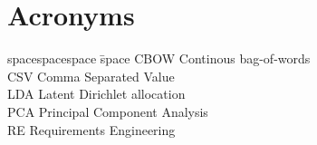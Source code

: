 \section*{Acronyms}

\begin{tabbing}
spacespacespace \= space \kill
CBOW \> Continous bag-of-words \\
CSV \> Comma Separated Value \\
LDA	\>	Latent Dirichlet allocation \\
PCA \> Principal Component Analysis\\
RE	\>	Requirements Engineering \\
\end{tabbing}